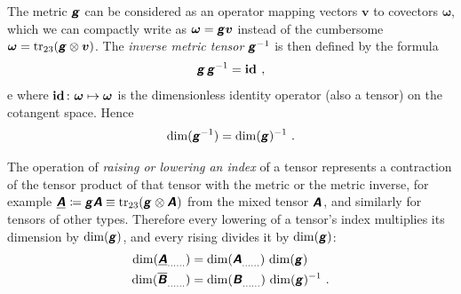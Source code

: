 \documentclass[\ifafour a4paper,12pt,\else a5paper,10pt,\fi%
onecolumn,oneside,article,%
british%
]{memoir}
\makeatletter
\theoremstyle{remark}
\theoremstyle{innote}
\newcommand*{\mathte}[1]{\textbf{\textit{\textsf{#1}}}}
\DeclareMathOperator{\tr}{tr}%
\newcommand*{\defd}{\coloneqq}
\renewcommand*{\|}[1][]{\nonscript\,#1\vert\nonscript\;\mathopen{}}
\newcommand*{\q}{}%
\DeclareRobustCommand*{\q}{%
  \mathord{\mathpalette\bigcdot@{}}%
}
\newcommand*{\bigcdot@scalefactor}{0.7}
\newcommand*{\bigcdot@widthfactor}{1.5}
\newcommand*{\bigcdot@}[2]{%
  \sbox0{$#1\vcenter{}$}%
  \sbox2{$#1\cdot\m@th$}%
  \hbox to \bigcdot@widthfactor\wd2{%
    \hfil
    \raise\ht0\hbox{%
      \scalebox{\bigcdot@scalefactor}{%
        \lower\ht0\hbox{$#1\bullet\m@th$}%
      }%
    }%
    \hfil
  }%
}
\newcommand*{\Un}{\textsf{1}}
\newcommand*{\Le}{\textsf{L}}
\newcommand*{\Ti}{\textsf{T}}
\newcommand*{\yA}{\mathte{A}}
\newcommand*{\yAg}{\underline{\yA}}
\newcommand*{\yB}{\mathte{B}}
\newcommand*{\yBg}{\overline{\yB}}
\newcommand*{\yg}{\mathte{g}}
\newcommand*{\yom}{\bm{\omega}}
\newcommand*{\yv}{\bm{v}}
\renewcommand*{\i}{\indices}
\newcommand*{\id}{\mathbf{id}}%
\makeatother
\begin{document}
\medskip

The metric $\yg$ can be considered as an operator mapping vectors $\yv$ to
covectors $\yom$, which we can compactly write as $\yom=\yg\yv$ instead of the
cumbersome $\yom = \tr_{23}(\yg\otimes\yv)$. The \emph{inverse metric
  tensor} $\yg\i{^{-1}^{\q\q}}$ is then defined by the formula
\begin{equation}
  \label{eq:inverse_g}
  \yg\,\yg^{-1} = \id\i{_{\q}^{\q}} \ ,
\end{equation}e
where $\id\i{_{\q}^{\q}}\colon \yom \mapsto \yom$ is the dimensionless
identity operator (also a tensor) on the cotangent space. Hence
\begin{equation}
  \label{eq:dim_ig}
  \dim(\yg^{-1}) = \dim(\yg)^{-1} \ .
\end{equation}

\medskip

The operation of \emph{raising or lowering an index} of a tensor represents
a contraction of the tensor product of that tensor with the metric or the
metric inverse, for example
$\yAg\i{_{\q\q}} \defd \yg\yA \equiv \tr_{23}(\yg\i{_{\q\q}} \otimes
\yA\i{^{\q}_{\q}})$ from the mixed tensor $\yA\i{^{\q}_{\q}}$, and
similarly for tensors of other types. Therefore every lowering of a
tensor's index multiplies its dimension by $\dim(\yg)$, and every rising
divides it by $\dim(\yg)$:
\begin{equation}
  \label{eq:raising_lowering}
  \begin{split}
  \dim(\yAg\i{_{\dotso}_{\q}_{\dotso}}) &=
  \dim(\yA\i{_{\dotso}^{\q}_{\dotso}})\,\dim(\yg)
\\
  \dim(\yBg\i{_{\dotso}^{\q}_{\dotso}}) &=
  \dim(\yB\i{_{\dotso}_{\q}_{\dotso}})\,\dim(\yg)^{-1} \ .
\end{split}
\end{equation}

\medskip
\end{document}
